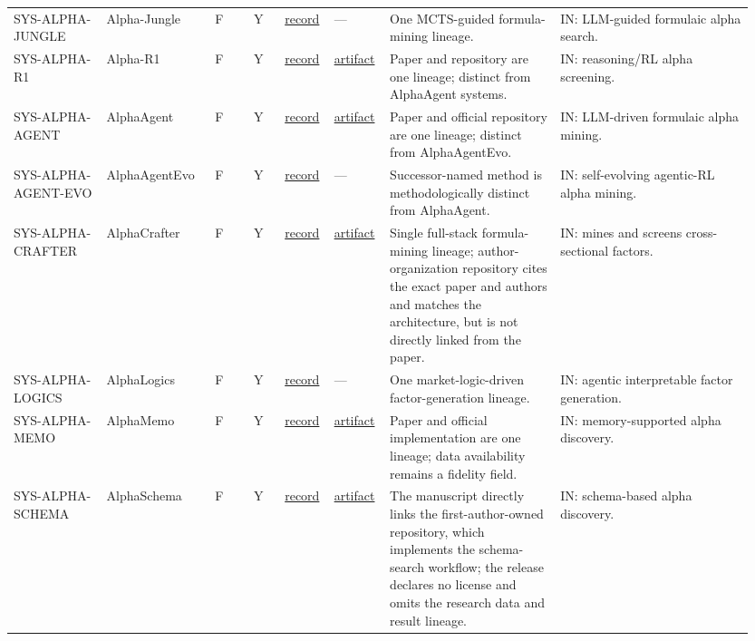 \begin{longtable}{@{}L{0.12\linewidth}L{0.14\linewidth}L{0.05\linewidth}L{0.04\linewidth}L{0.06\linewidth}L{0.07\linewidth}L{0.22\linewidth}L{0.25\linewidth}@{}}
SYS-\allowbreak{}ALPHA-\allowbreak{}JUNGLE & Alpha-Jungle & F & Y & \href{https://arxiv.org/abs/2505.11122}{record} & --- & One MCTS-guided formula-mining lineage. & IN: LLM-guided formulaic alpha search. \\
SYS-\allowbreak{}ALPHA-\allowbreak{}R1 & Alpha-R1 & F & Y & \href{https://arxiv.org/abs/2512.23515}{record} & \href{https://github.com/FinStep-AI/Alpha-R1}{artifact} & Paper and repository are one lineage; distinct from AlphaAgent systems. & IN: reasoning/RL alpha screening. \\
SYS-\allowbreak{}ALPHA-\allowbreak{}AGENT & AlphaAgent & F & Y & \href{https://arxiv.org/abs/2502.16789}{record} & \href{https://github.com/RndmVariableQ/AlphaAgent}{artifact} & Paper and official repository are one lineage; distinct from AlphaAgentEvo. & IN: LLM-driven formulaic alpha mining. \\
SYS-\allowbreak{}ALPHA-\allowbreak{}AGENT-\allowbreak{}EVO & AlphaAgentEvo & F & Y & \href{https://openreview.net/forum?id=lNmZrawUMu}{record} & --- & Successor-named method is methodologically distinct from AlphaAgent. & IN: self-evolving agentic-RL alpha mining. \\
SYS-\allowbreak{}ALPHA-\allowbreak{}CRAFTER & AlphaCrafter & F & Y & \href{https://arxiv.org/abs/2605.05580}{record} & \href{https://github.com/NJU-LINK/AlphaCrafter}{artifact} & Single full-stack formula-mining lineage; author-organization repository cites the exact paper and authors and matches the architecture, but is not directly linked from the paper. & IN: mines and screens cross-sectional factors. \\
SYS-\allowbreak{}ALPHA-\allowbreak{}LOGICS & AlphaLogics & F & Y & \href{https://arxiv.org/abs/2603.20247}{record} & --- & One market-logic-driven factor-generation lineage. & IN: agentic interpretable factor generation. \\
SYS-\allowbreak{}ALPHA-\allowbreak{}MEMO & AlphaMemo & F & Y & \href{https://arxiv.org/abs/2606.20625}{record} & \href{https://github.com/jarrettyu/AlphaMemo}{artifact} & Paper and official implementation are one lineage; data availability remains a fidelity field. & IN: memory-supported alpha discovery. \\
SYS-\allowbreak{}ALPHA-\allowbreak{}SCHEMA & AlphaSchema & F & Y & \href{https://arxiv.org/abs/2607.26642}{record} & \href{https://github.com/JingyangYi/AlphaSchema}{artifact} & The manuscript directly links the first-author-owned repository, which implements the schema-search workflow; the release declares no license and omits the research data and result lineage. & IN: schema-based alpha discovery. \\

\end{longtable}
